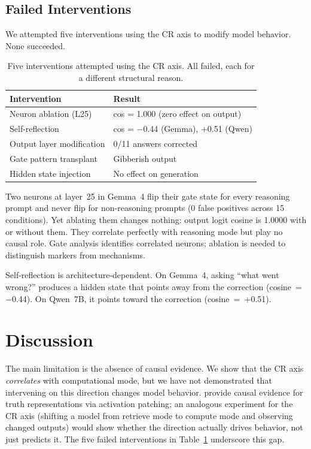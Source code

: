 \documentclass[11pt]{article}
\begin{document}
\subsection{Failed Interventions}

We attempted five interventions using the CR axis to modify model behavior. None succeeded.

\begin{table}[t]
\caption{Five interventions attempted using the CR axis. All failed, each for a different structural reason.}
\label{tab:negatives}
\vspace{4pt}
\centering
\small
\begin{tabular}{@{}ll@{}}
\toprule
Intervention & Result \\
\midrule
Neuron ablation (L25) & cos = 1.000 (zero effect on output) \\
Self-reflection & cos = $-$0.44 (Gemma), $+$0.51 (Qwen) \\
Output layer modification & 0/11 answers corrected \\
Gate pattern transplant & Gibberish output \\
Hidden state injection & No effect on generation \\
\bottomrule
\end{tabular}
\end{table}

Two neurons at layer~25 in Gemma~4 flip their gate state for every reasoning prompt and never flip for non-reasoning prompts (0 false positives across 15 conditions). Yet ablating them changes nothing: output logit cosine is 1.0000 with or without them. They correlate perfectly with reasoning mode but play no causal role. Gate analysis identifies correlated neurons; ablation is needed to distinguish markers from mechanisms.

Self-reflection is architecture-dependent. On Gemma~4, asking ``what went wrong?'' produces a hidden state that points away from the correction (cosine~=~$-$0.44). On Qwen~7B, it points toward the correction (cosine~=~$+$0.51).

\section{Discussion}

The main limitation is the absence of causal evidence. We show that the CR axis \emph{correlates} with computational mode, but we have not demonstrated that intervening on this direction changes model behavior. \citet{marks2024geometry} provide causal evidence for truth representations via activation patching; an analogous experiment for the CR axis (shifting a model from retrieve mode to compute mode and observing changed outputs) would show whether the direction actually drives behavior, not just predicts it. The five failed interventions in Table~\ref{tab:negatives} underscore this gap.
\end{document}
